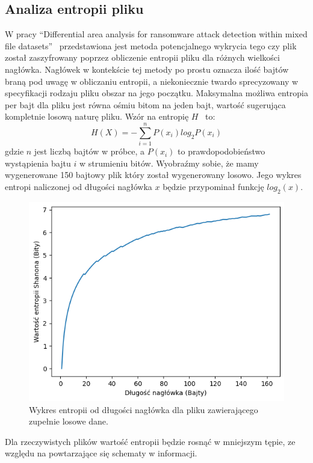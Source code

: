 \subsection{Analiza entropii pliku}
W pracy \foreignquote{english}{Differential area analysis for ransomware
attack detection within mixed file datasets}~\cite{davies_differential_2021} przedstawiona jest 
metoda potencjalnego wykrycia tego czy plik został zaszyfrowany poprzez obliczenie entropii pliku dla różnych wielkości nagłówka.
Nagłówek w kontekście tej metody po prostu oznacza ilość bajtów braną pod uwagę w obliczaniu entropii, a niekoniecznie
twardo sprecyzowany w specyfikacji rodzaju pliku obszar na jego początku. Maksymalna możliwa entropia per bajt dla pliku jest równa ośmiu bitom na jeden bajt,
wartość sugerująca kompletnie losową naturę pliku. Wzór na entropię $H$~\cite{6773024} to:
$$
H(X) = - \sum_{i=1}^{n} P(x_{i})log_{2}P(x_{i})
$$
gdzie $n$ jest liczbą bajtów w próbce, a $P(x_{i})$ to prawdopodobieństwo wystąpienia bajtu $i$ w strumieniu bitów.
Wyobraźmy sobie, że mamy wygenerowane 150 bajtowy plik który został wygenerowany losowo. Jego wykres entropi naliczonej 
od długości nagłówka $x$ będzie przypominał funkcję $log_{2}(x)$.
\begin{figure}[H]
    \centering
    \includegraphics[width=0.7\linewidth]{rysunki/randomy.png}
    \caption{Wykres entropii od długości nagłówka dla pliku zawierającego zupełnie losowe dane.}
    \label{fig:enter-label}
\end{figure}
Dla rzeczywistych plików wartość entropii będzie rosnąć w mniejszym tępie, ze względu na powtarzające
się schematy w informacji.
